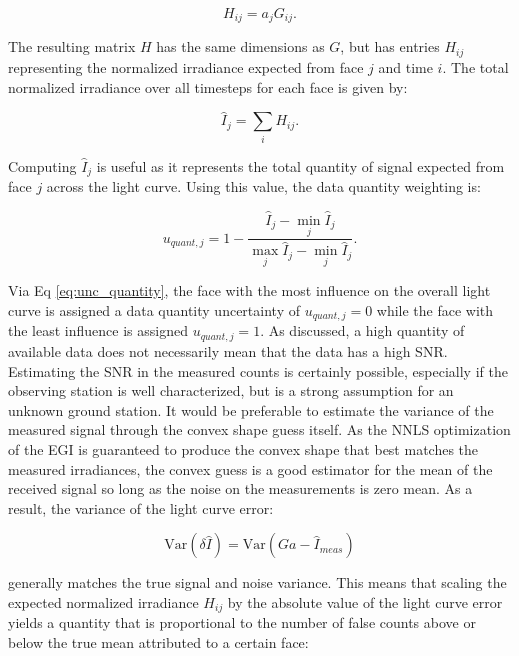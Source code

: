 \begin{equation} \label{eq:h_matrix}
  H_{ij} = a_j G_{ij}.
\end{equation}

The resulting matrix $H$ has the same dimensions as $G$, but has entries $H_{ij}$ representing the normalized irradiance expected from face $j$ and time $i$. The total normalized irradiance over all timesteps for each face is given by:

\begin{equation} \label{eq:total_norm_irrad}
  \hat{I}_{j} = \sum_{i}{H_{ij}}.
\end{equation}

Computing $\hat{I}_{j}$ is useful as it represents the total quantity of signal expected from face $j$ across the light curve. Using this value, the data quantity weighting is:

\begin{equation} \label{eq:unc_quantity}
  u_{quant,j} = 1 - \frac{\hat{I}_{j} - \min_{j}{\hat{I}_{j}}}{\max_{j}{\hat{I}_{j}} - \min_{j}{\hat{I}_{j}}}.
\end{equation}

Via Eq \ref{eq:unc_quantity}, the face with the most influence on the overall light curve is assigned a data quantity uncertainty of $u_{quant,j} = 0$ while the face with the least influence is assigned $u_{quant,j} = 1$. As discussed, a high quantity of available data does not necessarily mean that the data has a high SNR. Estimating the SNR in the measured counts is certainly possible, especially if the observing station is well characterized, but is a strong assumption for an unknown ground station. It would be preferable to estimate the variance of the measured signal through the convex shape guess itself. As the NNLS optimization of the EGI is guaranteed to produce the convex shape that best matches the measured irradiances, the convex guess is a good estimator for the mean of the received signal so long as the noise on the measurements is zero mean. As a result, the variance of the light curve error:

\begin{equation}
  \mathrm{Var}\left(\delta \hat{I}\right) = \mathrm{Var}\left(Ga - \hat{I}_{meas}\right)
\end{equation}

generally matches the true signal and noise variance. This means that scaling the expected normalized irradiance $H_{ij}$ by the absolute value of the light curve error yields a quantity that is proportional to the number of false counts above or below the true mean attributed to a certain face:

